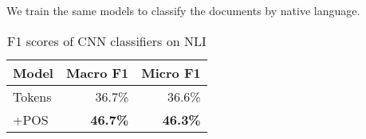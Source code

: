 We train the same models to classify the documents by native language.

\begin{table}
  \centering
  \begin{tabular}{|l|rr|}
    \toprule
    Model     & Macro F1        & Micro F1        \\
    \midrule
    Tokens    &         36.7\%  &         36.6\%  \\
    +POS      & \textbf{46.7\%} & \textbf{46.3\%} \\
    \bottomrule
  \end{tabular}
  \caption{F1 scores of CNN classifiers on NLI}
  \label{cnn-nli-results}
\end{table}
